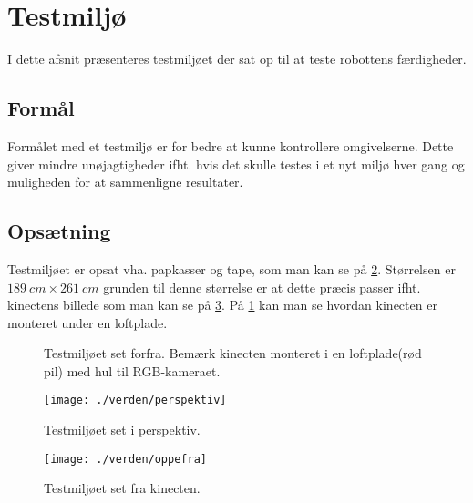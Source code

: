 \section{Testmiljø}
I dette afsnit præsenteres testmiljøet der sat op til at teste robottens færdigheder.

\subsection{Formål}
Formålet med et testmiljø er for bedre at kunne kontrollere omgivelserne.
Dette giver mindre unøjagtigheder ifht. hvis det skulle testes i et nyt miljø hver gang og muligheden for at sammenligne resultater.

\subsection{Opsætning}
Testmiljøet er opsat vha. papkasser og tape, som man kan se på \cref{testmiljo:perspektiv}.
Størrelsen er $189 \ cm \times 261 \ cm$ grunden til denne størrelse er at dette præcis passer ifht. kinectens billede som man kan se på \cref{testmiljo:oppefra}.
På \cref{testmiljo:forfra} kan man se hvordan kinecten er monteret under en loftplade.

\begin{figure}
\caption{Testmiljøet set forfra. Bemærk kinecten monteret i en loftplade(rød pil) med hul til RGB-kameraet.}
\label{testmiljo:forfra}
\end{figure}

\begin{figure}
\texttt{[image: ./verden/perspektiv]}
\label{testmiljo:perspektiv}
\caption{Testmiljøet set i perspektiv.}
\end{figure}

\begin{figure}
\texttt{[image: ./verden/oppefra]}
\caption{Testmiljøet set fra kinecten.}
\label{testmiljo:oppefra}
\end{figure}